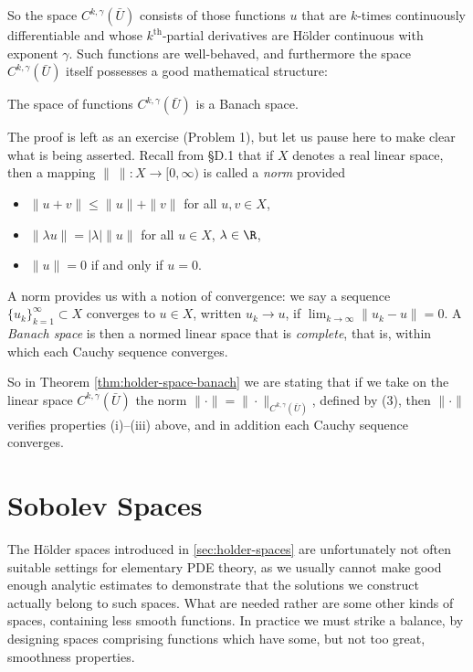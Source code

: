 So the space $C^{k,\gamma}(\bar U)$ consists of those functions $u$ that are $k$-times continuously differentiable and whose $k^{\text{th}}$-partial derivatives are Hölder continuous with exponent $\gamma$. Such functions are well-behaved, and furthermore the space $C^{k,\gamma}(\bar U)$ itself possesses a good mathematical structure:

\begin{theorem}
\label{thm:holder-space-banach}
The space of functions $C^{k,\gamma}(\bar U)$ is a Banach space.
\end{theorem}

The proof is left as an exercise (Problem 1), but let us pause here to make clear what is being asserted. Recall from §D.1 that if $X$ denotes a real linear space, then a mapping $\|\ \| : X \to [0,\infty)$ is called a \textit{norm} provided
\begin{itemize}
\item[(i)] $\|u+v\| \le \|u\| + \|v\|$ for all $u,v \in X$,
\item[(ii)] $\|\lambda u\| = |\lambda|\|u\|$ for all $u \in X$, $\lambda \in \R$,
\item[(iii)] $\|u\| = 0$ if and only if $u = 0$.
\end{itemize}
A norm provides us with a notion of convergence: we say a sequence $\{u_k\}_{k=1}^\infty \subset X$ converges to $u \in X$, written $u_k \to u$, if $\lim_{k\to\infty} \|u_k - u\| = 0$. A \textit{Banach space} is then a normed linear space that is \textit{complete}, that is, within which each Cauchy sequence converges.

So in Theorem \ref{thm:holder-space-banach} we are stating that if we take on the linear space $C^{k,\gamma}(\bar U)$ the norm $\|\cdot\| = \|\cdot\|_{C^{k,\gamma}(\bar U)}$, defined by (3), then $\|\cdot\|$ verifies properties (i)--(iii) above, and in addition each Cauchy sequence converges.

\section{Sobolev Spaces}
\label{sec:sobolev-spaces}

The Hölder spaces introduced in \cref{sec:holder-spaces} are unfortunately not often suitable settings for elementary PDE theory, as we usually cannot make good enough analytic estimates to demonstrate that the solutions we construct actually belong to such spaces. What are needed rather are some other kinds of spaces, containing less smooth functions. In practice we must strike a balance, by designing spaces comprising functions which have some, but not too great, smoothness properties.

